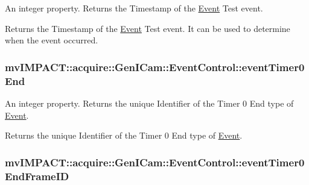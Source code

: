 An integer property. Returns the Timestamp of the \hyperlink{classmv_i_m_p_a_c_t_1_1acquire_1_1_event}{Event} Test event. 

Returns the Timestamp of the \hyperlink{classmv_i_m_p_a_c_t_1_1acquire_1_1_event}{Event} Test event. It can be used to determine when the event occurred. \hypertarget{classmv_i_m_p_a_c_t_1_1acquire_1_1_gen_i_cam_1_1_event_control_aa40c08e47812676fa8773d0da9403446}{
\subsubsection[{event\+Timer0\+End}]{ mv\+I\+M\+P\+A\+C\+T\+::acquire\+::\+Gen\+I\+Cam\+::\+Event\+Control\+::event\+Timer0\+End}}\label{classmv_i_m_p_a_c_t_1_1acquire_1_1_gen_i_cam_1_1_event_control_aa40c08e47812676fa8773d0da9403446}


An integer property. Returns the unique Identifier of the Timer 0 End type of \hyperlink{classmv_i_m_p_a_c_t_1_1acquire_1_1_event}{Event}. 

Returns the unique Identifier of the Timer 0 End type of \hyperlink{classmv_i_m_p_a_c_t_1_1acquire_1_1_event}{Event}. \hypertarget{classmv_i_m_p_a_c_t_1_1acquire_1_1_gen_i_cam_1_1_event_control_a2b22c14c5670f55bc710e17c63554684}{
\subsubsection[{event\+Timer0\+End\+Frame\+I\+D}]{ mv\+I\+M\+P\+A\+C\+T\+::acquire\+::\+Gen\+I\+Cam\+::\+Event\+Control\+::event\+Timer0\+End\+Frame\+I\+D}}\label{classmv_i_m_p_a_c_t_1_1acquire_1_1_gen_i_cam_1_1_event_control_a2b22c14c5670f55bc710e17c63554684}



